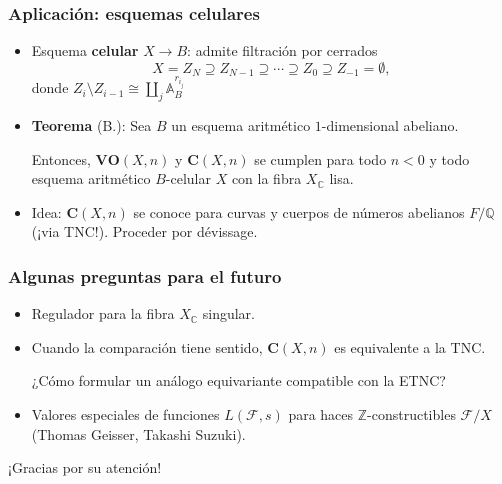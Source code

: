 \documentclass[handout]{beamer}
\newcommand{\CC}{\mathbb{C}}
\newcommand{\QQ}{\mathbb{Q}}
\newcommand{\ZZ}{\mathbb{Z}}
\renewcommand{\AA}{\mathbb{A}}
\begin{document}
\begin{frame}
  \frametitle{Aplicación: esquemas celulares}

  \begin{itemize}
  \item<2-> Esquema \textbf{celular} $X \to B$: admite filtración por
    cerrados
    \[ X = Z_N \supseteq Z_{N-1} \supseteq \cdots \supseteq Z_0 \supseteq Z_{-1} = \emptyset, \]
    donde $Z_i\setminus Z_{i-1} \cong \coprod_j \AA^{r_{i_j}}_B$

  \item<3-> \textbf{Teorema} (B.): Sea $B$ un esquema aritmético
    $1$-dimensional abeliano.

    Entonces, $\mathbf{VO} (X,n)$ y $\mathbf{C} (X,n)$ se cumplen para todo
    $n < 0$ y todo esquema aritmético $B$-celular $X$ con la fibra $X_\CC$ lisa.

  \item<4-> Idea: $\mathbf{C} (X,n)$ se conoce para curvas y cuerpos de números
    abelianos $F/\QQ$ (¡via TNC!). Proceder por dévissage.
  \end{itemize}
\end{frame}


\begin{frame}
  \frametitle{Algunas preguntas para el futuro}

  \begin{itemize}
  \item<2-> Regulador para la fibra $X_\CC$ singular.

  \item<3-> Cuando la comparación tiene sentido, $\mathbf{C} (X,n)$ es
    equivalente a la TNC.

    ¿Cómo formular un análogo equivariante compatible con la ETNC?

  \item<4-> Valores especiales de funciones $L (\mathcal{F},s)$ para haces
    $\ZZ$-constructibles $\mathcal{F}/X$ (Thomas Geisser, Takashi Suzuki).
  \end{itemize}
\end{frame}


\begin{frame}[plain]
  \headingfont

  \begin{center}
    {\huge ¡Gracias por su atención!}
  \end{center}
\end{frame}
\end{document}
